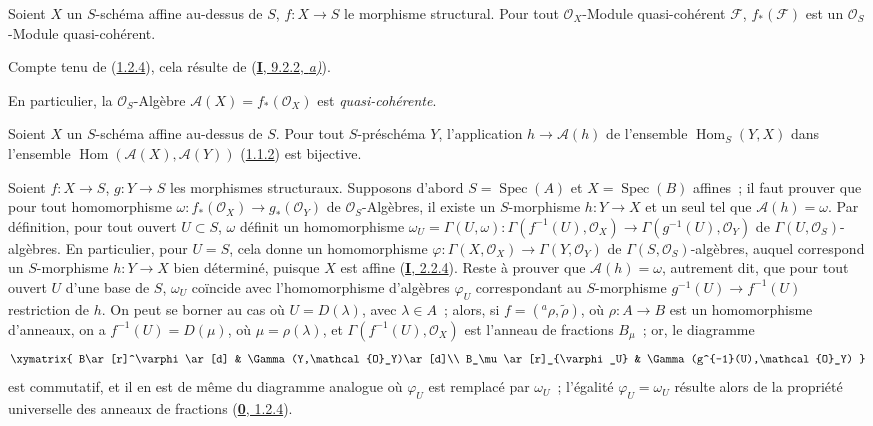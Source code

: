 \begin{proposition}[1.2.6]
\label{II.1.2.6-fr}
Soient $X$ un $S$-schéma affine au-dessus de $S$, $f:X\to S$ le morphisme
structural. Pour tout $\mathcal{O}_X$-Module quasi-cohérent $\mathcal{F}$,
$f_*(\mathcal{F})$ est un $\mathcal{O}_S$-Module quasi-cohérent.
\end{proposition}

Compte tenu de (\hyperref[II.1.2.4-fr]{1.2.4}), cela résulte de
(\hyperref[I.9.2.2-fr]{\textbf{I}, 9.2.2, \emph{a)}}).

En particulier, la $\mathcal{O}_S$-Algèbre
$\mathcal{A}(X)=f_*(\mathcal{O}_X)$ est \emph{quasi-cohérente}.

\begin{proposition}[1.2.7]
\label{II.1.2.7-fr}
Soient $X$ un $S$-schéma affine au-dessus de $S$. Pour tout $S$-préschéma
$Y$, l'application $h\to\mathcal{A}(h)$ de l'ensemble
$\operatorname{Hom}_S(Y,X)$ dans l'ensemble
$\operatorname{Hom}(\mathcal{A}(X),\mathcal{A}(Y))$
\textup{(\hyperref[II.1.1.2-fr]{1.1.2})} est bijective.
\end{proposition}

Soient $f:X\to S$, $g:Y\to S$ les morphismes structuraux. Supposons d'abord
$S=\operatorname{Spec}(A)$ et $X=\operatorname{Spec}(B)$ affines~; il faut
prouver que pour tout homomorphisme
$\omega:f_*(\mathcal{O}_X)\to g_*(\mathcal{O}_Y)$ de
$\mathcal{O}_S$-Algèbres, il existe un $S$-morphisme $h:Y\to X$ et un seul
tel que $\mathcal{A}(h)=\omega$. Par définition, pour tout ouvert $U\subset
S$, $\omega$ définit un homomorphisme
$\omega_U=\Gamma(U,\omega):\Gamma(f^{-1}(U),\mathcal{O}_X)\to\Gamma(g^{-1}(U),\mathcal{O}_Y)$
de $\Gamma(U,\mathcal{O}_S)$-algèbres. En particulier, pour $U=S$, cela
donne un homomorphisme
$\varphi:\Gamma(X,\mathcal{O}_X)\to\Gamma(Y,\mathcal{O}_Y)$ de
$\Gamma(S,\mathcal{O}_S)$-algèbres, auquel correspond un $S$-morphisme
$h:Y\to X$ bien déterminé, puisque $X$ est affine
(\hyperref[I.2.2.4-fr]{\textbf{I}, 2.2.4}). Reste à prouver que
$\mathcal{A}(h)=\omega$, autrement dit, que pour tout ouvert $U$ d'une base
de $S$, $\omega_U$ coïncide avec l'homomorphisme d'algèbres $\varphi_U$
correspondant au $S$-morphisme $g^{-1}(U)\to f^{-1}(U)$ restriction de $h$.
On peut se borner au cas où $U=D(\lambda)$, avec $\lambda\in A$~; alors, si
$f=({}^a\rho,\widetilde{\rho})$, où $\rho:A\to B$ est un homomorphisme
d'anneaux, on a $f^{-1}(U)=D(\mu)$, où $\mu=\rho(\lambda)$, et
$\Gamma(f^{-1}(U),\mathcal{O}_X)$ est l'anneau de fractions $B_\mu$~; or,
le diagramme
\[
  \xymatrix{
    B\ar[r]^\varphi\ar[d] & \Gamma(Y,\mathcal{O}_Y)\ar[d]\\
    B_\mu\ar[r]_{\varphi_U} & \Gamma(g^{-1}(U),\mathcal{O}_Y)
  }
\]
est commutatif, et il en est de même du diagramme analogue où $\varphi_U$
est remplacé par $\omega_U$~; l'égalité $\varphi_U=\omega_U$ résulte alors
de la propriété universelle des anneaux de fractions
(\hyperref[0.1.2.4-fr]{\textbf{0}, 1.2.4}).

